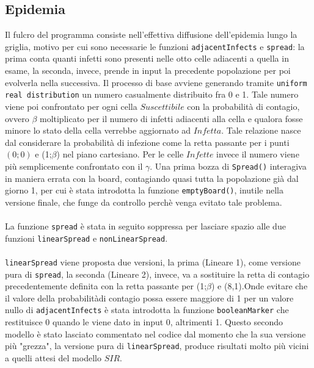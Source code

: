 \documentclass[a4paper]{article}
\begin{document}
\subsection{Epidemia}
Il fulcro del programma consiste nell'effettiva diffusione dell'epidemia lungo la griglia, motivo per cui sono necessarie le funzioni \texttt{adjacentInfects} e \texttt{spread}: la prima conta quanti infetti sono presenti nelle otto celle adiacenti a quella in esame, la seconda, invece, prende in input la precedente popolazione per poi evolverla nella successiva. Il processo di base avviene generando tramite \texttt{uniform real distribution} un numero casualmente distribuito fra 0 e 1. Tale numero viene poi confrontato per ogni cella $Suscettibile$ con la probabilità di contagio, ovvero $\beta$ moltiplicato per il numero di infetti adiacenti alla cella e qualora fosse minore lo stato della cella verrebbe aggiornato ad $Infetta$. Tale relazione nasce dal considerare la probabilità di infezione come la retta passante per i punti $(0;0)$ e (1;$\beta$) nel piano cartesiano. Per le celle $Infette$ invece il numero viene più semplicemente confrontato con il $\gamma$. Una prima bozza di \texttt{Spread()} interagiva in maniera errata con la board, contagiando quasi tutta la popolazione già dal giorno 1, per cui è stata introdotta la funzione \texttt{emptyBoard()}, inutile nella versione finale, che funge da controllo perchè venga evitato  tale problema.\\\\La funzione \texttt{spread} è stata in seguito soppressa per lasciare spazio alle due funzioni \texttt{linearSpread} e \texttt{nonLinearSpread}.\\ \\ \texttt{linearSpread} viene proposta due versioni, la prima (Lineare 1), come versione pura di \texttt{spread}, la seconda (Lineare 2), invece, va a sostituire la retta di contagio precedentemente definita con la retta passante per (1;$\beta$) e (8,1).Onde evitare che il valore della probabilitàdi contagio possa essere maggiore di 1 per un valore nullo di \texttt{adjacentInfects} è stata introdotta la funzione \texttt{booleanMarker} che restituisce 0 quando le viene dato in input 0, altrimenti 1. Questo secondo modello è stato lasciato commentato nel codice dal momento che la sua versione più "grezza", la versione pura di \texttt{linearSpread}, produce risultati molto più vicini a quelli attesi del modello $SIR$.\\ \\
\end{document}
